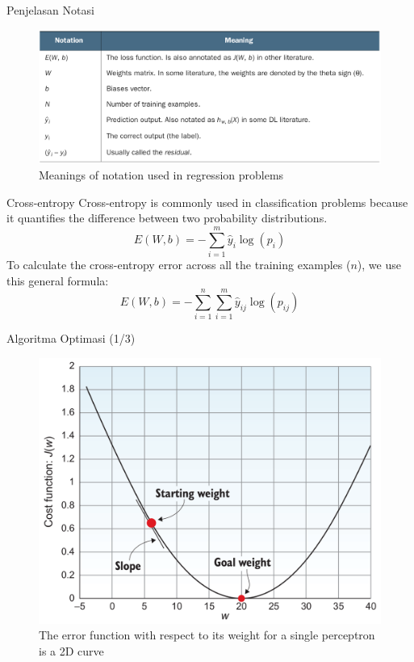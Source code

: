 \documentclass{beamer}
\begin{document}
\begin{frame}{Penjelasan Notasi}
	\begin{figure}[ht]
	\centering
	\includegraphics[scale=0.2]{images/notation}
	\caption{Meanings of notation used in regression problems}
\end{figure}								
\end{frame}

\begin{frame}{Cross-entropy}
	Cross-entropy is commonly used in classification problems because it quantifies the difference between two probability distributions.
	\begin{equation*}
		E(W,b) = -\sum_{i=1}^m{ \hat{y}_i \log(p_i) }
	\end{equation*}
	To calculate the cross-entropy error across all the training examples ($n$), we use this general formula: 
	\begin{equation*}
		E(W,b) = -\sum_{i=1}^n \sum_{i=1}^m{ \hat{y}_{ij} \log( p_{ij} ) }
	\end{equation*}
\end{frame}

\begin{frame}{Algoritma Optimasi (1/3)}
	\begin{figure}[ht]
	\centering
	\includegraphics[scale=0.2]{images/cost-function}
	\caption{The error function with respect to its weight for a single perceptron is a 2D curve}
\end{figure}									
\end{frame}
\end{document}
